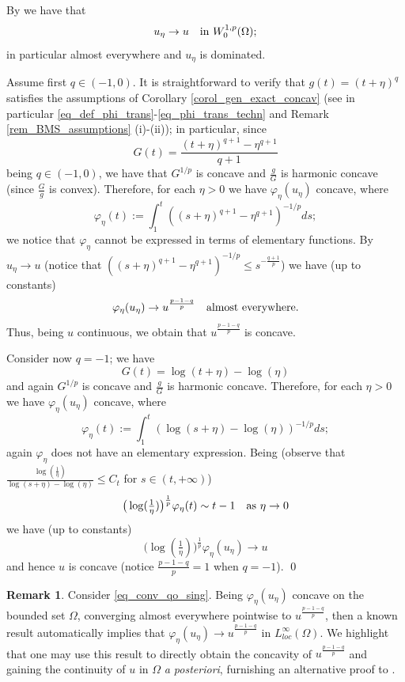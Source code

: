 \documentclass[11pt, reqno]{amsart}
\theoremstyle{definition}
\newtheorem{remark}[lemma]{Remark}
\numberwithin{equation}{section}
\renewenvironment{proof}[1][\proofname]{\medskip \noindent {\bfseries #1. }}{\qed \bigskip}
\begin{document}
\begin{proof}
By \cite[Lemma 4.5 and proof of Theorem 4.6]{CST16} we have that 
$$u_{\eta} \to u \quad \hbox{in $W^{1,p}_0(\Omega)$;}$$
in particular almost everywhere and $u_{\eta}$ is dominated. 

Assume first $q \in (-1,0)$.
It is straightforward to verify that $g(t)=(t+\eta)^q$ satisfies the assumptions of Corollary \ref{corol_gen_exact_concav} (see in particular \eqref{eq_def_phi_trans}-\eqref{eq_phi_trans_techn} and Remark \ref{rem_BMS_assumptions} (i)-(ii)); in particular, since
$$G(t)=\frac{(t+\eta)^{q+1}-\eta^{q+1}}{q+1}$$
being $q \in (-1, 0)$, we have that $G^{1/p}$ is concave and $\frac{g}{G}$ is harmonic concave (since $\frac{G}{g}$ is convex). 
Therefore, for each $\eta>0$ we have $\varphi_{\eta}(u_{\eta})$ concave, where
$$\varphi_{\eta}(t) := \int_1^t \left((s+\eta)^{q+1}-\eta^{q+1}\right)^{-1/p} ds;$$
we notice that $\varphi_{\eta}$ cannot be expressed in terms of elementary functions. 
By $u_{\eta} \to u$ (notice that $\left((s+\eta)^{q+1}-\eta^{q+1}\right)^{-1/p} \leq s^{-\frac{q+1}{p}}$) we have (up to constants)
\begin{equation}\label{eq_conv_qo_sing}
\varphi_{\eta}(u_{\eta}) \to u^{\frac{p-1-q}{p}} \quad \hbox{almost everywhere}.
\end{equation}
Thus, being $u$ continuous, we obtain that $u^{\frac{p-1-q}{p}}$ is concave. 

Consider now $q= -1$; we have
$$G(t) = \log(t+\eta) - \log(\eta)$$
and again $G^{1/p}$ is concave and $\frac{g}{G}$ is harmonic concave. 
Therefore, for each $\eta>0$ we have $\varphi_{\eta}(u_{\eta})$ concave, where
$$\varphi_{\eta}(t) := \int_1^t \left(\log(s+\eta)-\log(\eta)\right)^{-1/p} ds; $$
again $\varphi_{\eta}$ does not have an elementary expression.
Being (observe that $\frac{\log(\frac{1}{\eta})}{\log(s+\eta)-\log(\eta)} \leq C_t $ for $s \in (t, +\infty)$)
$$\big(\log(\tfrac{1}{\eta})\big)^{\frac{1}{p}} \varphi_{\eta}(t) \sim t - 1 \quad \hbox{as $\eta \to 0$}$$
we have (up to constants)
$$\big(\log(\tfrac{1}{\eta})\big)^{\frac{1}{p}} \varphi_{\eta}(u_{\eta}) \to u $$
and hence $u $ is concave (notice $\frac{p-1-q}{p}=1$ when $q=-1$).
\end{proof}

\begin{remark}
Consider \eqref{eq_conv_qo_sing}. Being $\varphi_{\eta}(u_{\eta})$ concave on the bounded set $\Omega$, converging almost everywhere pointwise to $u^{\frac{p-1-q}{p}}$, then a known result \cite[Theorem 10.8]{Roc97} automatically implies that $\varphi_{\eta}(u_{\eta}) \to u^{\frac{p-1-q}{p}}$ in $L^{\infty}_{loc}(\Omega)$. 
We highlight that one may use this result to directly obtain the concavity of $u^{\frac{p-1-q}{p}}$ and gaining the continuity of $u$ in $\Omega$ \emph{a posteriori}, furnishing an alternative proof to \cite{CaDe04}.
\end{remark}
\end{document}
